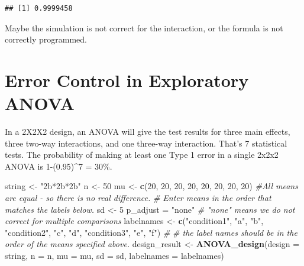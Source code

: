 \documentclass[]{book}
\newenvironment{Shaded}{\begin{snugshade}}{\end{snugshade}}
\newcommand{\CommentTok}[1]{\textcolor[rgb]{0.56,0.35,0.01}{\textit{#1}}}
\newcommand{\DataTypeTok}[1]{\textcolor[rgb]{0.13,0.29,0.53}{#1}}
\newcommand{\DecValTok}[1]{\textcolor[rgb]{0.00,0.00,0.81}{#1}}
\newcommand{\KeywordTok}[1]{\textcolor[rgb]{0.13,0.29,0.53}{\textbf{#1}}}
\newcommand{\NormalTok}[1]{#1}
\newcommand{\StringTok}[1]{\textcolor[rgb]{0.31,0.60,0.02}{#1}}
\begin{document}
\begin{verbatim}
## [1] 0.9999458
\end{verbatim}

Maybe the simulation is not correct for the interaction, or the formula is not correctly programmed.

\hypertarget{error-control-in-exploratory-anova}{%
\chapter{Error Control in Exploratory ANOVA}\label{error-control-in-exploratory-anova}}

In a 2X2X2 design, an ANOVA will give the test results for three main effects, three two-way interactions, and one three-way interaction. That's 7 statistical tests. The probability of making at least one Type 1 error in a single 2x2x2 ANOVA is 1-(0.95)\^{}7 = 30\%.

\begin{Shaded}
\begin{Highlighting}[]
\NormalTok{string <-}\StringTok{ "2b*2b*2b"}
\NormalTok{n <-}\StringTok{ }\DecValTok{50}
\NormalTok{mu <-}\StringTok{ }\KeywordTok{c}\NormalTok{(}\DecValTok{20}\NormalTok{, }\DecValTok{20}\NormalTok{, }\DecValTok{20}\NormalTok{, }\DecValTok{20}\NormalTok{, }\DecValTok{20}\NormalTok{, }\DecValTok{20}\NormalTok{, }\DecValTok{20}\NormalTok{, }\DecValTok{20}\NormalTok{) }\CommentTok{#All means are equal - so there is no real difference.}
\CommentTok{# Enter means in the order that matches the labels below.}
\NormalTok{sd <-}\StringTok{ }\DecValTok{5}
\NormalTok{p_adjust =}\StringTok{ "none"}
\CommentTok{# "none" means we do not correct for multiple comparisons}
\NormalTok{labelnames <-}\StringTok{ }\KeywordTok{c}\NormalTok{(}\StringTok{"condition1"}\NormalTok{, }\StringTok{"a"}\NormalTok{, }\StringTok{"b"}\NormalTok{, }\StringTok{"condition2"}\NormalTok{, }\StringTok{"c"}\NormalTok{, }\StringTok{"d"}\NormalTok{, }\StringTok{"condition3"}\NormalTok{, }\StringTok{"e"}\NormalTok{, }\StringTok{"f"}\NormalTok{) }\CommentTok{#}
\CommentTok{# the label names should be in the order of the means specified above.}
\NormalTok{design_result <-}\StringTok{ }\KeywordTok{ANOVA_design}\NormalTok{(}\DataTypeTok{design =}\NormalTok{ string,}
                   \DataTypeTok{n =}\NormalTok{ n, }
                   \DataTypeTok{mu =}\NormalTok{ mu, }
                   \DataTypeTok{sd =}\NormalTok{ sd, }
                   \DataTypeTok{labelnames =}\NormalTok{ labelnames)}
\end{Highlighting}
\end{Shaded}
\end{document}
